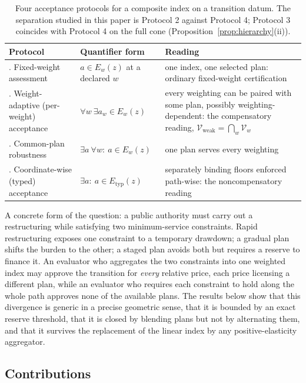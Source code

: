 \documentclass[preprint,11pt,authoryear]{elsarticle}
\theoremstyle{definition}
\theoremstyle{remark}
\newcommand{\Etyp}{E_{\mathrm{typ}}}
\newcommand{\Vweak}{\mathcal{V}_{\mathrm{weak}}}
\begin{document}
\begin{table}[!htbp]
\centering\small
\caption{Four acceptance protocols for a composite index on a transition datum. The separation studied in this paper is Protocol 2 against Protocol 4; Protocol 3 coincides with Protocol 4 on the full cone (Proposition~\ref{prop:hierarchy}(ii)).}
\label{tab:protocols}
\begin{tabularx}{\textwidth}{>{\raggedright\arraybackslash}p{} >{\raggedright\arraybackslash}p{} X}
\toprule
Protocol & Quantifier form & Reading \\
\midrule
1. Fixed-weight assessment & $a\in E_w(z)$ at a declared $w$ & one index, one selected plan: ordinary fixed-weight certification \\
2. Weight-adaptive (per-weight) acceptance & $\forall w\ \exists a_w\in E_w(z)$ & every weighting can be paired with some plan, possibly weighting-dependent: the compensatory reading, $\Vweak=\bigcap_w\mathcal V_w$ \\
3. Common-plan robustness & $\exists a\ \forall w:\ a\in E_w(z)$ & one plan serves every weighting \\
4. Coordinate-wise (typed) acceptance & $\exists a:\ a\in\Etyp(z)$ & separately binding floors enforced path-wise: the noncompensatory reading \\
\bottomrule
\end{tabularx}
\end{table}

A concrete form of the question: a public authority must carry out a restructuring while satisfying two minimum-service constraints. Rapid restructuring exposes one constraint to a temporary drawdown; a gradual plan shifts the burden to the other; a staged plan avoids both but requires a reserve to finance it. An evaluator who aggregates the two constraints into one weighted index may approve the transition for \emph{every} relative price, each price licensing a different plan, while an evaluator who requires each constraint to hold along the whole path approves none of the available plans. The results below show that this divergence is generic in a precise geometric sense, that it is bounded by an exact reserve threshold, that it is closed by blending plans but not by alternating them, and that it survives the replacement of the linear index by any positive-elasticity aggregator.

\subsection{Contributions}
\end{document}

